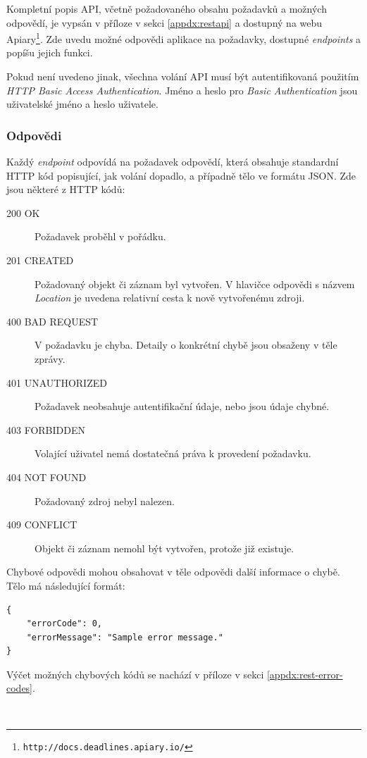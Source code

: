 \documentclass[thesis=B,czech]{FITthesis}[2012/06/26]
\begin{document}
			
			Kompletní popis API, včetně požadovaného obsahu požadavků a možných odpovědí, je vypsán v příloze v sekci \ref{appdx:restapi} a dostupný na webu Apiary\footnote{\texttt{http://docs.deadlines.apiary.io/}}. Zde uvedu možné odpovědi aplikace na požadavky, dostupné \textit{endpoints} a popíšu jejich funkci. 
			
			Pokud není uvedeno jinak, všechna volání API musí být autentifikovaná použitím \textit{HTTP Basic Access Authentication}. \cite{http-basic-auth} Jméno a heslo pro \textit{Basic Authentication} jsou uživatelské jméno a heslo uživatele.
			
			\subsubsection{Odpovědi}
			Každý \textit{endpoint} odpovídá na požadavek odpovědí, která obsahuje standardní HTTP kód popisující, jak volání dopadlo, a případně tělo ve formátu JSON. Zde jsou některé z HTTP kódů:
			\begin{description}
				\item[200 OK] Požadavek proběhl v pořádku.
				\item[201 CREATED] Požadovaný objekt či záznam byl vytvořen. V hlavičce odpovědi s názvem \textit{Location} je uvedena relativní cesta k nově vytvořenému zdroji.
				\item[400 BAD REQUEST] V požadavku je chyba. Detaily o konkrétní chybě jsou obsaženy v těle zprávy.
				\item[401 UNAUTHORIZED] Požadavek neobsahuje autentifikační údaje, nebo jsou údaje chybné.
				\item[403 FORBIDDEN] Volající uživatel nemá dostatečná práva k provedení požadavku.
				\item[404 NOT FOUND] Požadovaný zdroj nebyl nalezen.
				\item[409 CONFLICT] Objekt či záznam nemohl být vytvořen, protože již existuje.
			\end{description}
			Chybové odpovědi mohou obsahovat v těle odpovědi další informace o chybě. Tělo má následující formát:
				\begin{Verbatim}[obeytabs,tabsize=2]
{
	"errorCode": 0,
	"errorMessage": "Sample error message."
}
				\end{Verbatim}
				Výčet možných chybových kódů se nachází v příloze v sekci \ref{appdx:rest-error-codes}.
			
			\hfill \\
			
\end{document}
